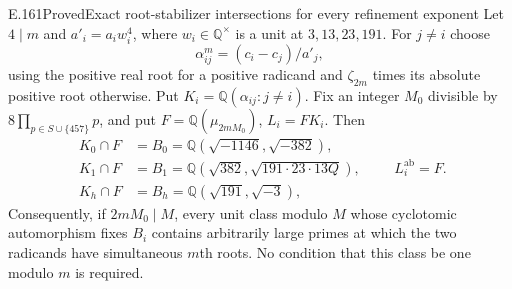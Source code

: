 \begin{result}{E.161}{Proved}{Exact root-stabilizer intersections for every refinement exponent}
Let $4\mid m$ and $a'_i=a_iw_i^4$, where $w_i\in\mathbb Q^\times$
is a unit at $3,13,23,191$.  For $j\ne i$ choose
\[
 \alpha_{ij}^m=(c_i-c_j)/a'_j,
\]
using the positive real root for a positive radicand and
$\zeta_{2m}$ times its absolute positive root otherwise.  Put
$K_i=\mathbb Q(\alpha_{ij}:j\ne i)$.
Fix an integer $M_0$ divisible by $8\prod_{p\in S\cup\{457\}}p$,
and put $F=\mathbb Q(\mu_{2mM_0})$, $L_i=FK_i$.  Then
\[
\begin{split}
K_0\cap F&=B_0=\mathbb Q(\sqrt{-1146},\sqrt{-382}),\\
K_1\cap F&=B_1=\mathbb Q(\sqrt{382},\sqrt{191\cdot23\cdot13Q}),\\
K_h\cap F&=B_h=\mathbb Q(\sqrt{191},\sqrt{-3}),
\end{split}
\qquad L_i^{\mathrm{ab}}=F.
\tag{E.161.1}
\]
Consequently, if $2mM_0\mid M$, every unit class modulo $M$
whose cyclotomic automorphism fixes $B_i$ contains arbitrarily
large primes at which the two radicands have simultaneous
$m$th roots.  No condition that this class be one modulo $m$
is required.
\end{result}
